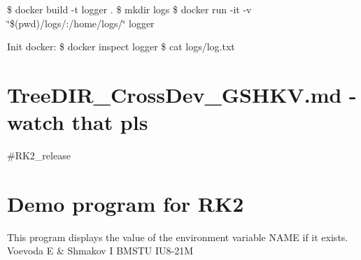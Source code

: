 \$ docker build -\/t logger . \$ mkdir logs \$ docker run -\/it -\/v \char`\"{}\$(pwd)/logs/\+:/home/logs/\char`\"{} logger

Init docker\+: \$ docker inspect logger \$ cat logs/log.\+txt

\section*{Tree\+D\+I\+R\+\_\+\+Cross\+Dev\+\_\+\+G\+S\+H\+K\+V.\+md -\/ watch that pls }

\href{https://travis-ci.org/geminishkv/rk2}{\tt }

\#\+R\+K2\+\_\+release

\section*{Demo program for R\+K2}

This program displays the value of the environment variable N\+A\+ME if it exists. Voevoda E \& Shmakov I B\+M\+S\+TU I\+U8-\/21M 